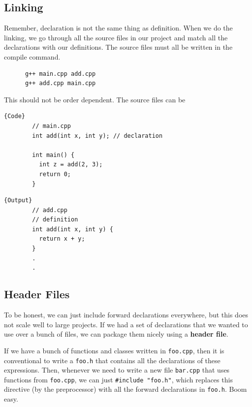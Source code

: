 \documentclass{article}
\newcounter{definition}[section]
\begin{document}
  \subsection{Linking} 

    Remember, declaration is not the same thing as definition. When we do the linking, we go through all the source files in our project and match all the declarations with our definitions. The source files must all be written in the compile command. 

    \begin{lstlisting}
      g++ main.cpp add.cpp
      g++ add.cpp main.cpp
    \end{lstlisting}

    This should not be order dependent. The source files can be 

    \noindent\begin{minipage}{.5\textwidth}
      \begin{lstlisting}[]{Code}
        // main.cpp 
        int add(int x, int y); // declaration

        int main() {  
          int z = add(2, 3); 
          return 0; 
        }
      \end{lstlisting}
      \end{minipage}
      \hfill
      \begin{minipage}{.49\textwidth}
      \begin{lstlisting}[]{Output}
        // add.cpp
        // definition
        int add(int x, int y) { 
          return x + y;
        }
        .
        .
      \end{lstlisting}
    \end{minipage}

  \subsection{Header Files} 

    To be honest, we can just include forward declarations everywhere, but this does not scale well to large projects. If we had a set of declarations that we wanted to use over a bunch of files, we can package them nicely using a \textbf{header file}. 
    
    If we have a bunch of functions and classes written in \texttt{foo.cpp}, then it is conventional to write a \texttt{foo.h} that contains all the declarations of these expressions. Then, whenever we need to write a new file \texttt{bar.cpp} that uses functions from \texttt{foo.cpp}, we can just \texttt{\#include "foo.h"}, which replaces this directive (by the preprocessor) with all the forward declarations in \texttt{foo.h}. Boom easy. 
\end{document}
